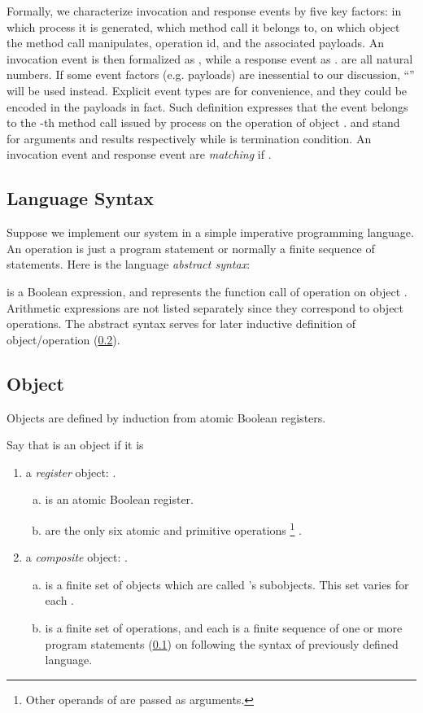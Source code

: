 \documentclass[a4paper,USenglish]{lipics-v2016}
\begin{document}
Formally, we characterize invocation and response events by five key factors:
in which process it is generated, which method call it belongs to,
on which object the method call manipulates, operation id, and the associated payloads.
An invocation event is then formalized as 
, while a response event as .
 are all natural numbers.
If some event factors (e.g. payloads) are inessential to our discussion,
``\textunderscore'' will be used instead.
Explicit event types are for convenience, and they could be encoded in the payloads in fact.
Such definition expresses that the event belongs to the -th method call
issued by process  on the operation  of object .
 and  stand for arguments and results respectively
while  is termination condition.
An invocation event  and response event 
are \textit{matching} if .

\subsection{Language Syntax}\label{sec:syntax}
Suppose we implement our system in a simple imperative programming language.
An operation is just a program statement or normally a finite sequence of statements.
Here is the language \textit{abstract syntax}:
		
 is a Boolean expression, and  represents the function call of operation  on object .
Arithmetic expressions are not listed separately since they correspond to object operations.
The abstract syntax serves for later inductive definition of object/operation (\ref{sec:object}).

\subsection{Object}\label{sec:object}
Objects are defined by induction from atomic Boolean registers.
\begin{definition}\label{def_object}
	Say that  is an object if it is
	\begin{enumerate}[(1)]
		\item
		a \textit{register} object: .
		\begin{enumerate}[(a)]
			\item
			 is an atomic Boolean register.
			\item
			
			are the only six atomic and primitive operations
			\footnote
			{
				Other operands of  are passed as arguments.
			}
			.
		\end{enumerate}
		\item
		a \textit{composite} object: .
		\begin{enumerate}[(a)]
			\item
			 is a finite set of objects which are called 's subobjects.
			This set varies for each .
			\item
			 is a finite set of operations,
			and each is a finite sequence of one or more program statements
			(\ref{sec:syntax}) on  following the syntax of previously defined language.
		\end{enumerate}
	\end{enumerate}	
\end{definition}
\end{document}
